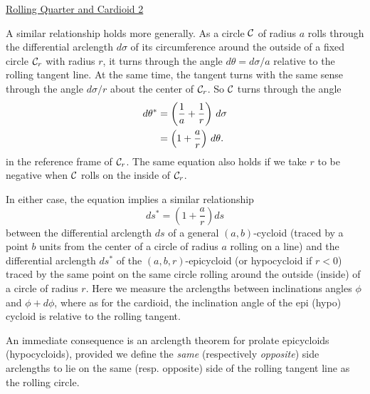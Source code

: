 \documentclass{ximera}
\begin{document}
\begin{onlineOnly}
    \begin{center}
\end{center}
\end{onlineOnly}

\href{https://www.desmos.com/calculator/grcnlkuqan}{Rolling Quarter and Cardioid 2}


A similar relationship holds more generally. As a circle ${\cal C}$ of radius $a$ rolls through the differential arclength $d\sigma$ of its circumference around the outside of a fixed circle ${\cal C}_r$ with radius $r$, it turns through the angle $d\theta = d\sigma/a$ relative to the rolling tangent line. At the same time, the tangent turns with the same sense through the angle $d\sigma/r$ about the center of ${\cal C}_r$. So ${\cal C}$ turns through the angle
\begin{align}
     d\theta^* &= \left(\frac{1}{a} + \frac{1}{r} \right) \, d\sigma  \notag \\
                    &= \left( 1 + \frac{a}{r}  \right) \, d\theta .  \label{Eq:RollAngle}
\end{align}
in the reference frame of ${\cal C}_r$. The same equation also holds if we take $r$ to be negative when ${\cal C}$ rolls on the inside of ${\cal C}_r$.

In either case, the equation implies a similar relationship 
\[
  ds^*  =  \left( 1 + \frac{a}{r}  \right)  ds
\]
between the differential arclength $ds$ of a general $(a,b)$-cycloid (traced by a point $b$ units from the center of a circle of radius $a$ rolling on a line) and the differential arclength $ds^*$ of the $(a,b,r)$-epicycloid (or hypocycloid if $r<0$) traced by the same point on the same circle rolling around the outside (inside) of a circle of radius $r$. Here we measure the arclengths between inclinations angles $\phi$ and $\phi+d\phi$, where as for the cardioid, the inclination angle of the epi (hypo) cycloid is relative to the rolling tangent.


An immediate consequence is an arclength theorem for prolate epicycloids (hypocycloids), provided we define the \emph{same} (respectively \emph{opposite}) side arclengths to lie on the same (resp. opposite) side of the rolling tangent line as the rolling circle.
\end{document}
